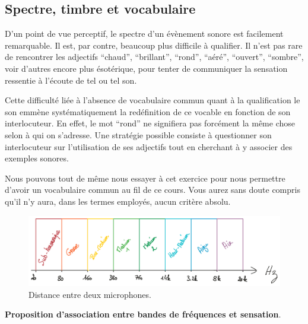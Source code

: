 \documentclass[
]{book}
\begin{document}
\hypertarget{spectre-timbre-et-vocabulaire}{%
\subsection{Spectre, timbre et vocabulaire}\label{spectre-timbre-et-vocabulaire}}

D'un point de vue perceptif, le spectre d'un évènement sonore est facilement remarquable. Il est, par contre, beaucoup plus difficile à qualifier. Il n'est pas rare de rencontrer les adjectifs ``chaud'', ``brillant'', ``rond'', ``aéré'', ``ouvert'', ``sombre'', voir d'autres encore plus ésotérique, pour tenter de communiquer la sensation ressentie à l'écoute de tel ou tel son.

Cette difficulté liée à l'absence de vocabulaire commun quant à la qualification le son emmène systématiquement la redéfinition de ce vocable en fonction de son interlocuteur. En effet, le mot ``rond'' ne signifiera pas forcément la même chose selon à qui on s'adresse. Une stratégie possible consiste à questionner son interlocuteur sur l'utilisation de ses adjectifs tout en cherchant à y associer des exemples sonores.

Nous pouvons tout de même nous essayer à cet exercice pour nous permettre d'avoir un vocabulaire commun au fil de ce cours. Vous aurez sans doute compris qu'il n'y aura, dans les termes employés, aucun critère absolu.

\begin{figure}

{\centering \includegraphics[width=1\linewidth]{_resources/drawings/spectre} 

}

\caption{Distance entre deux microphones.}\label{fig:unnamed-chunk-6}
\end{figure}

\textbf{Proposition d'association entre bandes de fréquences et sensation}.
\end{document}
